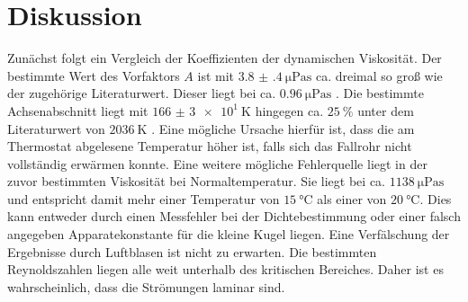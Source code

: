 
\section{Diskussion}
\label{sec:Diskussion}
Zunächst folgt ein Vergleich der Koeffizienten der dynamischen Viskosität. Der
bestimmte Wert des Vorfaktors $A$ ist mit $\SI{3.8(4)}{\micro\pascal\second}$ ca.
dreimal so groß wie der zugehörige Literaturwert. Dieser liegt bei ca.
$\SI{0.96}{\micro\pascal\second}$ \cite{etalit}. Die bestimmte Achsenabschnitt liegt mit
$\SI{166(3)e1}{\kelvin}$ hingegen ca. $\SI{25}{\percent}$ unter dem Literaturwert
von $\SI{2036}{\kelvin}$ \cite{etalit}. Eine mögliche Ursache hierfür ist, dass die am Thermostat
abgelesene Temperatur höher ist, falls sich das Fallrohr nicht vollständig erwärmen
konnte. Eine weitere mögliche Fehlerquelle liegt in der zuvor bestimmten Viskosität
bei Normaltemperatur. Sie liegt bei ca. $\SI{1138}{\micro\pascal\second}$ und
entspricht damit mehr einer Temperatur von $\SI{15}{\degreeCelsius}$ \cite{vislit} als einer von
$\SI{20}{\degreeCelsius}$. Dies kann entweder durch einen Messfehler bei der
Dichtebestimmung oder einer falsch angegeben Apparatekonstante für die kleine Kugel
liegen. Eine Verfälschung der Ergebnisse durch Luftblasen ist nicht zu erwarten.
Die bestimmten Reynoldszahlen liegen alle weit unterhalb des kritischen
Bereiches. Daher ist es wahrscheinlich, dass die Strömungen laminar sind.
